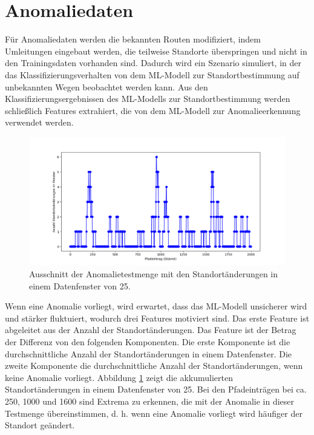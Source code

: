 \section{Anomaliedaten}
\label{sec:data_anomalie}
Für Anomaliedaten werden die bekannten Routen modifiziert, indem Umleitungen eingebaut werden, die teilweise Standorte überspringen
und nicht in den Trainingsdaten vorhanden sind.
Dadurch wird ein Szenario simuliert, in der das Klassifizierungsverhalten von dem ML-Modell zur Standortbestimmung auf unbekannten Wegen beobachtet werden kann.
Aus den Klassifizierungsergebnissen des ML-Modells zur Standortbestimmung werden schließlich Features extrahiert,
die von dem ML-Modell zur Anomalieerkennung verwendet werden.
\begin{figure}[h!]
    \centering
    \includegraphics[width=\linewidth]{images/feature_window_location_changes.png}
    \caption{Ausschnitt der Anomalietestmenge mit den Standortänderungen in einem Datenfenster von 25.}
    \label{fig:window_location_changes}
\end{figure}
\newline
\newline
Wenn eine Anomalie vorliegt, wird erwartet, dass das ML-Modell unsicherer wird und stärker fluktuiert,
wodurch drei Features motiviert sind.
Das erste Feature ist abgeleitet aus der Anzahl der Standortänderungen.
Das Feature ist der Betrag der Differenz von den folgenden Komponenten.
Die erste Komponente ist die durchschnittliche Anzahl der Standortänderungen in einem Datenfenster.
Die zweite Komponente die durchschnittliche Anzahl der Standortänderungen, wenn keine Anomalie vorliegt.
Abbildung \ref{fig:window_location_changes} zeigt die akkumulierten Standortänderungen in einem Datenfenster von 25.
Bei den Pfadeinträgen bei ca. 250, 1000 und 1600 sind Extrema zu erkennen, die mit der Anomalie in dieser Testmenge übereinstimmen,
d. h. wenn eine Anomalie vorliegt wird häufiger der Standort geändert.
